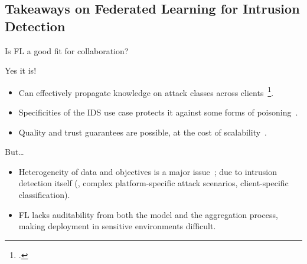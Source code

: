 \subsection{Takeaways on Federated Learning for Intrusion Detection}



\begin{frame}{Is FL a good fit for collaboration?}

  \begin{block}{Yes it is!}
    \begin{itemize}
      \item Can effectively propagate knowledge on attack classes across clients~\footcite{lavaur_icdcs_demo_2024}.
      \item Specificities of the IDS use case protects it against some forms of poisoning~\eiffel.
      \item Quality and trust guarantees are possible, at the cost of scalability~\radar.
    \end{itemize}
  \end{block}

  \pause
  \begin{block}{But\dots}
    \begin{itemize}[<+->]
      \item Heterogeneity of data and objectives is a major issue~\slr; due to intrusion detection itself (\eg, complex platform-specific attack scenarios, client-specific classification).
      \item FL lacks \alert{auditability} from both the model and the aggregation process, making deployment in sensitive environments difficult.
    \end{itemize}
  \end{block}
\end{frame}

